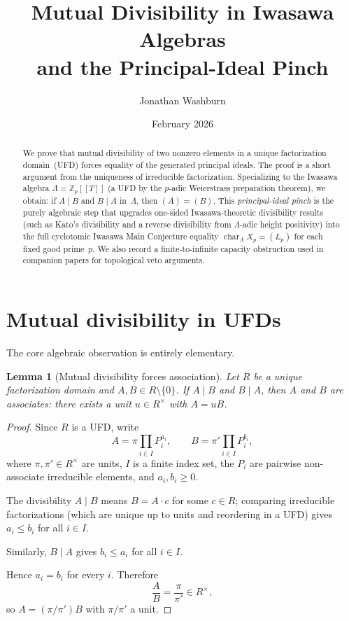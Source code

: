 \documentclass[11pt]{amsart}
\title[Mutual Divisibility and the Principal-Ideal Pinch]{Mutual Divisibility in Iwasawa Algebras\\
and the Principal-Ideal Pinch}
\author{Jonathan Washburn}
\date{February 2026}
\newtheorem{lemma}[theorem]{Lemma}
\theoremstyle{definition}
\theoremstyle{remark}
\newcommand{\Zp}{\mathbb{Z}_p}
\newcommand{\Lam}{\Lambda}
\DeclareMathOperator{\chr}{char}
\begin{document}
\begin{abstract}
We prove that mutual divisibility of two nonzero elements in a unique
factorization domain~(UFD) forces equality of the generated principal
ideals.  The proof is a short argument from the uniqueness of
irreducible factorization.
Specializing to the Iwasawa algebra $\Lam=\Zp[\![T]\!]$ (a UFD by the
$p$-adic Weierstrass preparation theorem), we obtain:
if $A\mid B$ and $B\mid A$ in~$\Lam$, then $(A)=(B)$.
This \emph{principal-ideal pinch} is the purely algebraic step that
upgrades one-sided Iwasawa-theoretic divisibility results
(such as Kato's divisibility and a reverse divisibility from
$\Lam$-adic height positivity) into the full cyclotomic Iwasawa Main
Conjecture equality $\chr_\Lam X_p=(L_p)$ for each fixed good prime~$p$.
We also record a finite-to-infinite capacity obstruction used in
companion papers for topological veto arguments.
\end{abstract}

\maketitle

\section{Mutual divisibility in UFDs}\label{sec:ufd}

The core algebraic observation is entirely elementary.

\begin{lemma}[Mutual divisibility forces association]\label{lem:mutual}
Let $R$ be a unique factorization domain and $A,B\in R\setminus\{0\}$.
If $A\mid B$ and $B\mid A$, then $A$ and $B$ are associates:
there exists a unit $u\in R^\times$ with $A=uB$.
\end{lemma}
\begin{proof}
Since $R$ is a UFD, write
\[
A=\pi\prod_{i\in I} P_i^{a_i},\qquad
B=\pi'\prod_{i\in I} P_i^{b_i},
\]
where $\pi,\pi'\in R^\times$ are units, $I$ is a finite index set,
the $P_i$ are pairwise non-associate irreducible elements, and
$a_i,b_i\ge 0$.

The divisibility $A\mid B$ means $B=A\cdot c$ for some $c\in R$;
comparing irreducible factorizations (which are unique up to units and
reordering in a UFD) gives $a_i\le b_i$ for all $i\in I$.

Similarly, $B\mid A$ gives $b_i\le a_i$ for all $i\in I$.

Hence $a_i=b_i$ for every $i$.  Therefore
\[
\frac{A}{B}=\frac{\pi}{\pi'}\in R^\times,
\]
so $A=(\pi/\pi')B$ with $\pi/\pi'$ a unit.
\end{proof}
\end{document}
